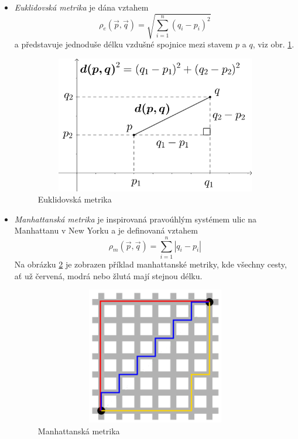 \begin{itemize}
	\item \emph{Euklidovská metrika} je dána vztahem 
	\begin{equation}
	\rho_e\left(\vec{p},\vec{q}\right)=\sqrt{\sum_{i=1}^n\left(q_i-p_i\right)^2}
	\end{equation}
	a představuje jednoduše délku vzdušné spojnice mezi stavem $p$ a $q$, viz obr. \ref{obr:euclid}.
	
	\begin{figure}[htb]
		\begin{center}
			\includegraphics*[width=15cm,height=6cm,keepaspectratio]{obr/euclid}
		\end{center}
		\caption{Euklidovská metrika}
		\label{obr:euclid}
	\end{figure}
	
	\item \emph{Manhattanská metrika} je inspirovaná pravoúhlým systémem ulic na Manhattanu v New Yorku a je definovaná vztahem
	\begin{equation}
	\rho_m\left(\vec{p},\vec{q}\right)=\sum_{i=1}^n\left|q_i-p_i\right|
	\end{equation}
	Na obrázku \ref{obr:manhat} je zobrazen příklad manhattanské metriky, kde všechny cesty, ať už červená, modrá nebo žlutá mají stejnou délku. 
	
	\begin{figure}[htb]
		\begin{center}
			\includegraphics*[width=15cm,height=6cm,keepaspectratio]{obr/manhat}
		\end{center}
		\caption{Manhattanská metrika}
		\label{obr:manhat}
	\end{figure}


\end{itemize}
